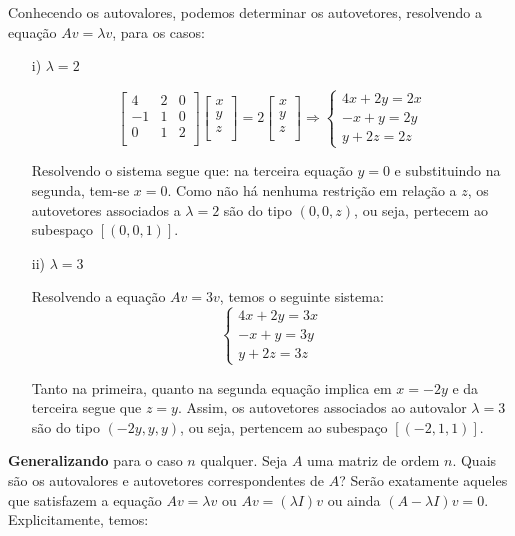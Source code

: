 \documentclass[oneside,a4paper,12pt]{article}
\begin{document}
Conhecendo os autovalores, podemos determinar os autovetores, resolvendo a equação $Av = \lambda v$, para os casos:
\begin{enumerate}
	\item [i)] $\lambda = 2$
	
	$$\left[
	\begin{array}{ccc}
	4	&	2	&	0\\
	-1	&	1	&	0 \\
	0	&	1	&	2	\\
	\end{array}
	\right] \left[
	\begin{array}{c}
	x	\\
	y	\\
	z	\\
	\end{array}
	\right] = 2 \left[
	\begin{array}{c}
	x	\\
	y	\\
	z	\\
	\end{array}
	\right] \Rightarrow \begin{cases}
	4x + 2y  =  2x \\
	-x + y  =  2y \\
	y + 2z = 2z
	\end{cases} $$
	
	Resolvendo o sistema segue que: na terceira equação $y = 0$ e substituindo na segunda, tem-se $x = 0$. Como não há nenhuma restrição em relação a $z$, os autovetores associados a $\lambda = 2$ são do tipo $(0,0,z)$, ou seja, pertecem ao subespaço $[(0,0,1)]$.
	
	\item [ii)] $\lambda = 3$
	
	Resolvendo a equação $Av = 3v$, temos o seguinte sistema:
	$$\begin{cases}
	4x + 2y  =  3x \\
	-x + y  =  3y \\
	y + 2z = 3z
	\end{cases} $$
	
	Tanto na primeira, quanto na segunda equação implica em $x = -2y$ e da terceira segue que $z = y$. Assim, os autovetores associados ao autovalor $\lambda = 3$ são do tipo $(-2y,y,y)$, ou seja, pertencem ao subespaço $[(-2,1,1)]$.
\end{enumerate}

{\bf Generalizando } para o caso $n$ qualquer. Seja $A$ uma matriz de ordem $n$. Quais são os autovalores e autovetores correspondentes de $A$? Serão exatamente aqueles que satisfazem a equação $Av = \lambda v$ ou $Av = (\lambda I)v$ ou ainda $(A - \lambda I)v = 0$. Explicitamente, temos:
\end{document}
